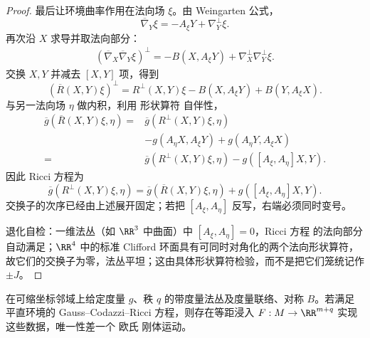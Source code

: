 \begin{proof}
最后让环境曲率作用在法向场 $\xi$。由 Weingarten 公式，
\[
\overline\nabla_Y\xi
=-A_\xi Y+\nabla_Y^\perp\xi.
\]
再次沿 $X$ 求导并取法向部分：
\[
\begin{aligned}
(\overline\nabla_X\overline\nabla_Y\xi)^\perp
=-B(X,A_\xi Y)
+\nabla_X^\perp\nabla_Y^\perp\xi.
\end{aligned}
\]
交换 $X,Y$ 并减去 $[X,Y]$ 项，得到
\[
(\overline R(X,Y)\xi)^\perp
=R^\perp(X,Y)\xi
-B(X,A_\xi Y)+B(Y,A_\xi X).
\]
与另一法向场 $\eta$ 做内积，利用 形状算符 自伴性，
\[
\begin{aligned}
\overline g(\overline R(X,Y)\xi,\eta)
={}&\overline g(R^\perp(X,Y)\xi,\eta)\\
&-g(A_\eta X,A_\xi Y)
+g(A_\eta Y,A_\xi X)\\
={}&\overline g(R^\perp(X,Y)\xi,\eta)
-g([A_\xi,A_\eta]X,Y).
\end{aligned}
\]
因此 Ricci 方程为
\begin{equation}\label{eq:math-dg-ricci-general}
{
\overline g(R^\perp(X,Y)\xi,\eta)
=\overline g(\overline R(X,Y)\xi,\eta)
+g([A_\xi,A_\eta]X,Y).}
\end{equation}
交换子的次序已经由上述展开固定；若把 $[A_\xi,A_\eta]$ 反写，右端必须同时变号。

退化自检：一维法丛（如 $\RR^3$ 中曲面）中 $[A_\xi,A_\eta]=0$，Ricci 方程 的法向部分自动满足；$\RR^4$ 中的标准 Clifford 环面具有可同时对角化的两个法向形状算符，故它们的交换子为零，法丛平坦；这由具体形状算符检验，而不是把它们笼统记作 $\pm J$。
\end{proof}

\begin{theorem}[欧氏 浸入的局部基本定理]
在可缩坐标邻域上给定度量 $g$、秩 $q$ 的带度量法丛及度量联络、对称 $B$。若满足平直环境的 Gauss--Codazzi--Ricci 方程，则存在等距浸入 $F:M\to\RR^{m+q}$ 实现这些数据，唯一性差一个 欧氏 刚体运动。
\end{theorem}

